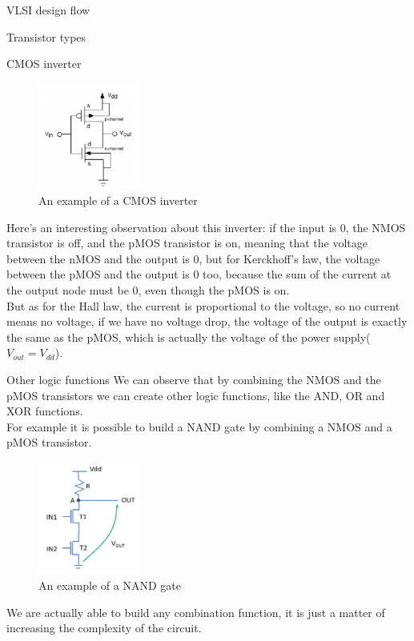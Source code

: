 \begin{section}{VLSI design flow}
\begin{subsection}{Transistor types}
\begin{subsubsection}{CMOS inverter}
      \begin{figure}[h]
        \centering
        \includegraphics[width=0.3\textwidth]{img/hardware/cmos inverter.png}
        \caption{An example of a CMOS inverter}
        \label{fig:cmos inverter}
      \end{figure}
      Here's an interesting observation about this inverter: if the input is 0, the NMOS transistor
      is off, and the pMOS transistor is on, meaning that the voltage between the nMOS and the output
      is 0, but for Kerckhoff's law, the voltage between the pMOS and the output is 0 too, because 
      the sum of the current at the output node must be 0, even though the pMOS is on.\\
      But as for the Hall law, the current is proportional to the voltage, so no current means no
      voltage, if we have no voltage drop, the voltage of the output is exactly the same as the
      pMOS, which is actually the voltage of the power supply($V_{out}=V_{dd}$).\\
    \end{subsubsection}
    \begin{subsubsection}{Other logic functions}
      We can observe that by combining the NMOS and the pMOS transistors we can create other logic
      functions, like the AND, OR and XOR functions.\\
      For example it is possible to build a NAND gate by combining a NMOS and a pMOS transistor.
      \begin{figure}[h]
        \centering
        \includegraphics[width=0.3\textwidth]{img/hardware/nand gate.png}
        \caption{An example of a NAND gate}
        \label{fig:nand gate}
      \end{figure}
      We are actually able to build any combination function, it is just a matter of increasing the
      complexity of the circuit.\\
    \end{subsubsection}
  \end{subsection}
\end{section}
